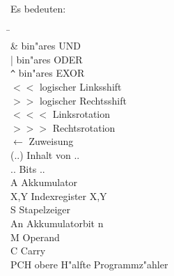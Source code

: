\documentclass[12pt,a4paper,twoside]{report}
\begin{document}
Es bedeuten:

\begin{tabbing}
\hspace{2cm} \= \kill \\
\&             \> bin"ares UND \\
|              \> bin"ares ODER \\
\verb!^!       \> bin"ares EXOR \\
$<<$           \> logischer Linksshift \\
$>>$           \> logischer Rechtsshift \\
$<<<$          \> Linksrotation \\
$>>>$          \> Rechtsrotation \\
$\leftarrow$   \> Zuweisung \\
(..)           \> Inhalt von .. \\
{..}           \> Bits .. \\
A              \> Akkumulator \\
X,Y            \> Indexregister X,Y \\
S              \> Stapelzeiger \\
An             \> Akkumulatorbit n \\
M              \> Operand \\
C              \> Carry \\
PCH            \> obere H"alfte Programmz"ahler \\
\end{tabbing}
\end{document}
